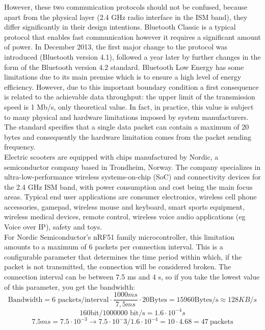\documentclass[binding=0.6cm,LaM,noexaminfo]{sapthesis}
\begin{document}
However, these two communication protocols should not be confused, because apart from the physical layer (2.4 GHz radio interface in the ISM band), they differ significantly in their design intentions. Bluetooth Classic is a typical protocol that enables fast communication however it requires a significant amount of power. In December 2013, the first major change to the protocol was introduced (Bluetooth version 4.1), followed a year later by further changes in the form of the Bluetooth version 4.2 standard.
Bluetooth Low Energy has some limitations due to its main premise which is to ensure a high level of energy efficiency. However, due to this important boundary condition a first consequence is related to the achievable data throughput: the upper limit of the transmission speed is 1 Mb/s, only theoretical value. In fact, in practice, this value is subject to many physical and hardware limitations imposed by system manufacturers. The standard specifies that a single data packet can contain a maximum of 20 bytes and consequently the hardware limitation comes from the packet sending frequency. \\ 
Electric scooters are equipped with chips manufactured by Nordic, a semiconductor company based in Trondheim, Norway. The company specializes in ultra-low-performance wireless systems-on-chip (SoC) and connectivity devices for the 2.4 GHz ISM band, with power consumption and cost being the main focus areas. Typical end user applications are consumer electronics, wireless cell phone accessories, gamepad, wireless mouse and keyboard, smart sports equipment, wireless medical devices, remote control, wireless voice audio applications (eg Voice over IP), safety and toys.\\ 
For Nordic Semiconductor's nRF51 family microcontroller, this limitation amounts to a maximum of 6 packets per connection interval. This is a configurable parameter that determines the time period within which, if the packet is not transmitted, the connection will be considered broken. The connection interval can be between 7.5 ms and 4 s, so if you take the lowest value of this parameter, you get the bandwidth:
\begin{equation*}
	\text{Bandwidth} = 6 \text{ packets/interval} \cdot \frac{1000ms}{7,5ms} \cdot 20 \text{Bytes} = 15960 \text{Bytes/s} \approx 128 KB/s
\end{equation*}
\begin{equation*}
    160 \text{bit}/1000000 \text{ bit/s} = 1.6 \cdot 10^{-4} s
\end{equation*}
\begin{equation*}
    7.5 ms = 7.5 \cdot 10^{-3} \rightarrow 7.5 \cdot 10^-3 /1.6 \cdot 10^{-4} = 10\cdot 4.68 = 47 \ \text{packets}    
\end{equation*}
\end{document}
